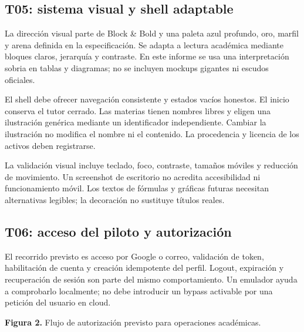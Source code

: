 \subsection{T05: sistema visual y shell adaptable}
La dirección visual parte de Block \& Bold y una paleta azul profundo, oro, marfil y arena definida en la especificación. Se adapta a lectura académica mediante bloques claros, jerarquía y contraste. En este informe se usa una interpretación sobria en tablas y diagramas; no se incluyen mockups gigantes ni escudos oficiales.

El shell debe ofrecer navegación consistente y estados vacíos honestos. El inicio conserva el tutor cerrado. Las materias tienen nombres libres y eligen una ilustración genérica mediante un identificador independiente. Cambiar la ilustración no modifica el nombre ni el contenido. La procedencia y licencia de los activos deben registrarse.

La validación visual incluye teclado, foco, contraste, tamaños móviles y reducción de movimiento. Un screenshot de escritorio no acredita accesibilidad ni funcionamiento móvil. Los textos de fórmulas y gráficas futuras necesitan alternativas legibles; la decoración no sustituye títulos reales.

\subsection{T06: acceso del piloto y autorización}
El recorrido previsto es acceso por Google o correo, validación de token, habilitación de cuenta y creación idempotente del perfil. Logout, expiración y recuperación de sesión son parte del mismo comportamiento. Un emulador ayuda a comprobarlo localmente; no debe introducir un bypass activable por una petición del usuario en cloud.

\begin{center}
\end{center}
\begin{center}\small\textbf{Figura 2.} Flujo de autorización previsto para operaciones académicas.\end{center}

